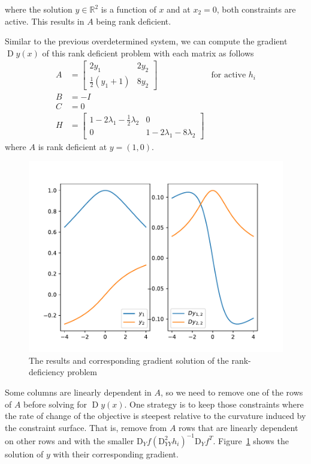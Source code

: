 where the solution $y \in \mathbb{R}^2$ is a function of $x$ and at $x_2 = 0$, both constraints are active. This results in $A$ being rank deficient. 
\par Similar to the previous overdetermined system, we can compute the gradient $\operatorname{D}y(x)$ of this rank deficient problem with each matrix as follows
$$
\begin{array}{lll}
    A &= \begin{bmatrix}
         2y_1 & 2 y_2 \\ \frac{1}{2} (y_1 + 1) & 8 y_2
         \end{bmatrix} & \text{for active $h_i$} \\
    B &= -I \\
    C &= 0 \\
    H &= \begin{bmatrix}
         1 - 2 \lambda_1 - \frac{1}{2} \lambda_2 & 0 \\
         0 & 1 - 2 \lambda_1 - 8 \lambda_2
         \end{bmatrix}
\end{array}
$$
where $A$ is rank deficient at $y = (1, 0)$. 

\begin{figure}[t]
    \label{fig:rank-deficiency-gradient}
    \centering
    \includegraphics[page=1, width=.8\textwidth]{figs/gradient-rank-deficient.pdf}
    \caption{The results and corresponding gradient solution of the rank-deficiency problem~\citep{SG:19}}
\end{figure}
\par Some columns are linearly dependent in $A$, so we need to remove one of the rows of $A$ before solving for $\operatorname{D}y(x)$. One strategy is to keep those constraints where the rate of change of the objective is steepest relative to the curvature induced by the constraint surface. That is, remove from $A$ rows that are linearly dependent on other rows and with the smaller $\text{D}_{Y}f (\text{D}_{YY}^2 h_i)^{-1} \text{D}_{Y}f^T$. Figure~\ref{fig:rank-deficiency-gradient} shows the solution of $y$ with their corresponding gradient. 

